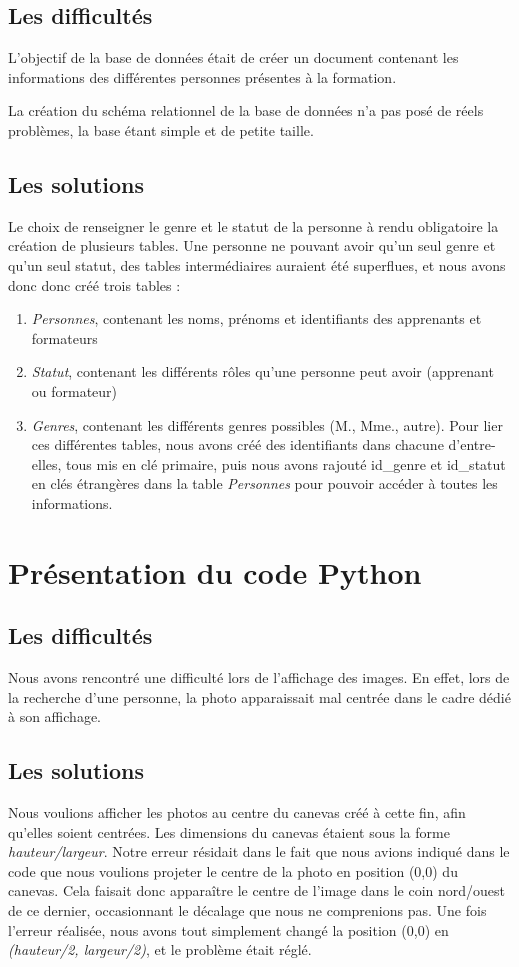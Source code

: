 \documentclass[french]{article}
\begin{document}
\subsection{Les difficultés}
    L'objectif de la base de données était de créer un document contenant les informations des différentes personnes présentes à la formation. 
    
    La création du schéma relationnel de la base de données n'a pas posé de réels problèmes, la base étant simple et de petite taille.
\subsection{Les solutions}
    Le choix de renseigner le genre et le statut de la personne à rendu obligatoire la création de plusieurs tables. 
    Une personne ne pouvant avoir qu'un seul genre et qu'un seul statut, des tables intermédiaires auraient été superflues, et nous avons donc donc créé trois tables :
    \begin{enumerate}
        \item \textit{Personnes}, contenant les noms, prénoms et identifiants des apprenants et formateurs
        \item \textit{Statut}, contenant les différents rôles qu'une personne peut avoir (apprenant ou formateur)
        \item \textit{Genres}, contenant les différents genres possibles (M., Mme., autre). Pour lier ces différentes tables, nous avons créé des identifiants dans chacune d'entre-elles, tous mis en clé primaire, puis nous avons rajouté id\_genre et id\_statut en clés étrangères dans la table \textit{Personnes} pour pouvoir accéder à toutes les informations. \\
    \end{enumerate} 
    
    
\section{Présentation du code Python}
\subsection{Les difficultés}
    Nous avons rencontré une difficulté lors de l'affichage des images. En effet, lors de la recherche d'une personne, la photo apparaissait mal centrée dans le cadre dédié à son affichage. 
\subsection{Les solutions}
    Nous voulions afficher les photos au centre du canevas créé à cette fin, afin qu'elles soient centrées. Les dimensions du canevas étaient sous la forme \textit{hauteur/largeur}. Notre erreur résidait dans le fait que nous avions indiqué dans le code que nous voulions projeter le centre de la photo en position (0,0) du canevas. Cela faisait donc apparaître le centre de l'image dans le coin nord/ouest de ce dernier, occasionnant le décalage que nous ne comprenions pas. Une fois l'erreur réalisée, nous avons tout simplement changé la position (0,0) en \textit{(hauteur/2, largeur/2)}, et le problème était réglé. \\  
    
\end{document}
